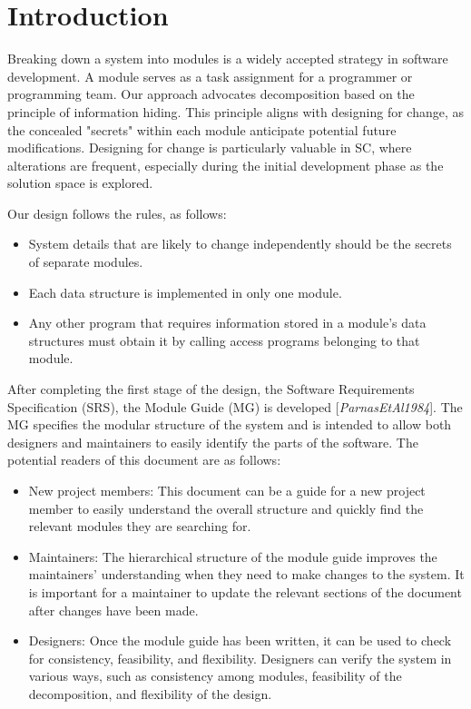 \documentclass[12pt, titlepage]{article}
\begin{document}
\newpage

\tableofcontents

\listoftables

\listoffigures

\newpage


\section{Introduction}

Breaking down a system into modules is a widely accepted strategy in software development. A module serves as a task assignment for a programmer or programming team. Our approach advocates decomposition based on the principle of information hiding. This principle aligns with designing for change, as the concealed "secrets" within each module anticipate potential future modifications. Designing for change is particularly valuable in SC, where alterations are frequent, especially during the initial development phase as the solution space is explored.

Our design follows the rules, as follows:
\begin{itemize}
\item System details that are likely to change independently should be the
  secrets of separate modules.
\item Each data structure is implemented in only one module.
\item Any other program that requires information stored in a module's data
  structures must obtain it by calling access programs belonging to that module.
\end{itemize}

After completing the first stage of the design, the Software Requirements
Specification (SRS), the Module Guide (MG) is developed [\textit{ParnasEtAl1984}]. The MG
specifies the modular structure of the system and is intended to allow both
designers and maintainers to easily identify the parts of the software.  The
potential readers of this document are as follows:

\begin{itemize}
\item New project members: This document can be a guide for a new project member
  to easily understand the overall structure and quickly find the
  relevant modules they are searching for.
\item Maintainers: The hierarchical structure of the module guide improves the
  maintainers' understanding when they need to make changes to the system. It is
  important for a maintainer to update the relevant sections of the document
  after changes have been made.
\item Designers: Once the module guide has been written, it can be used to
  check for consistency, feasibility, and flexibility. Designers can verify the
  system in various ways, such as consistency among modules, feasibility of the
  decomposition, and flexibility of the design.
\end{itemize}
\end{document}
